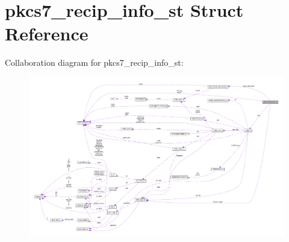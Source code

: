 \hypertarget{structpkcs7__recip__info__st}{}\section{pkcs7\+\_\+recip\+\_\+info\+\_\+st Struct Reference}
\label{structpkcs7__recip__info__st}


Collaboration diagram for pkcs7\+\_\+recip\+\_\+info\+\_\+st\+:
\nopagebreak
\begin{figure}[H]
\begin{center}
\leavevmode
\includegraphics[width=350pt]{structpkcs7__recip__info__st__coll__graph}
\end{center}
\end{figure}
